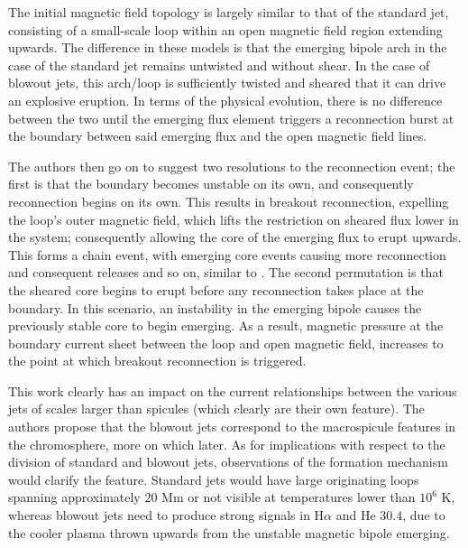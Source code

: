 The initial magnetic field topology is largely similar to that of the standard jet, consisting of a small-scale loop within an open magnetic field region extending upwards.
The difference in these models is that the emerging bipole arch in the case of the standard jet remains untwisted and without shear.
In the case of blowout jets, this arch/loop is sufficiently twisted and sheared that it can drive an explosive eruption.
In terms of the physical evolution, there is no difference between the two until the emerging flux element triggers a reconnection burst at the boundary between said emerging flux and the open magnetic field lines.

The authors then go on to suggest two resolutions to the reconnection event; the first is that the boundary becomes unstable on its own, and consequently reconnection begins on its own.
This results in breakout reconnection, expelling the loop's outer magnetic field, which lifts the restriction on sheared flux lower in the system; consequently allowing the core of the emerging flux to erupt upwards.
This forms a chain event, with emerging core events causing more reconnection and consequent releases and so on, similar to \cite{Antiochos1998}.
The second permutation is that the sheared core begins to erupt before any reconnection takes place at the boundary.
In this scenario, an instability in the emerging bipole causes the previously stable core to begin emerging.
As a result, magnetic pressure at the boundary current sheet between the loop and open magnetic field, increases to the point at which breakout reconnection is triggered.

This work clearly has an impact on the current relationships between the various jets of scales larger than spicules (which clearly are their own feature).
The authors propose that the blowout jets correspond to the macrospicule features in the chromosphere, more on which later.
As for implications with respect to the division of standard and blowout jets, observations of the formation mechanism would clarify the feature.
Standard jets would have large originating loops spanning approximately $20$ Mm or not visible at temperatures lower than $10^6$ K, whereas blowout jets need to produce strong signals in H$\alpha$ and He $30.4$, due to the cooler plasma thrown upwards from the unstable magnetic bipole emerging.

